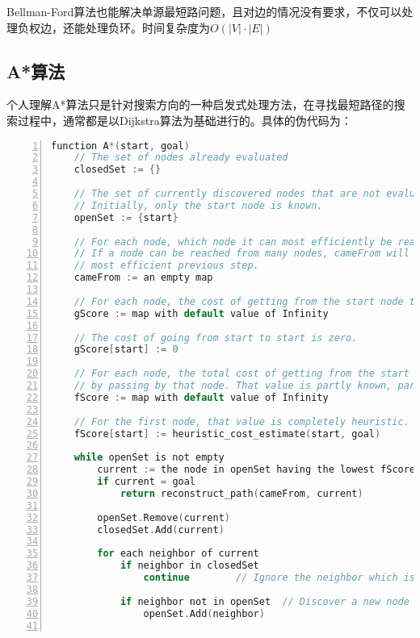 Bellman-Ford算法也能解决单源最短路问题，且对边的情况没有要求，不仅可以处理负权边，还能处理负环。时间复杂度为$O(|V|\cdot |E|)$

\subsection{A*算法}
个人理解A*算法只是针对搜索方向的一种启发式处理方法，在寻找最短路径的搜索过程中，通常都是以Dijkstra算法为基础进行的。具体的伪代码为：
\begin{lstlisting}[language=c,numbers=left,firstnumber = 1,numberstyle=\tiny,breaklines = true,keywordstyle=\color{blue!70},commentstyle=\color{red!50!green!50!blue!50},frame=shadowbox, rulesepcolor=\color{red!20!green!20!blue!20}]
function A*(start, goal)
    // The set of nodes already evaluated
    closedSet := {}

    // The set of currently discovered nodes that are not evaluated yet.
    // Initially, only the start node is known.
    openSet := {start}

    // For each node, which node it can most efficiently be reached from.
    // If a node can be reached from many nodes, cameFrom will eventually contain the
    // most efficient previous step.
    cameFrom := an empty map

    // For each node, the cost of getting from the start node to that node.
    gScore := map with default value of Infinity

    // The cost of going from start to start is zero.
    gScore[start] := 0

    // For each node, the total cost of getting from the start node to the goal
    // by passing by that node. That value is partly known, partly heuristic.
    fScore := map with default value of Infinity

    // For the first node, that value is completely heuristic.
    fScore[start] := heuristic_cost_estimate(start, goal)

    while openSet is not empty
        current := the node in openSet having the lowest fScore[] value
        if current = goal
            return reconstruct_path(cameFrom, current)

        openSet.Remove(current)
        closedSet.Add(current)

        for each neighbor of current
            if neighbor in closedSet
                continue		// Ignore the neighbor which is already evaluated.

            if neighbor not in openSet	// Discover a new node
                openSet.Add(neighbor)
            

\end{lstlisting}
